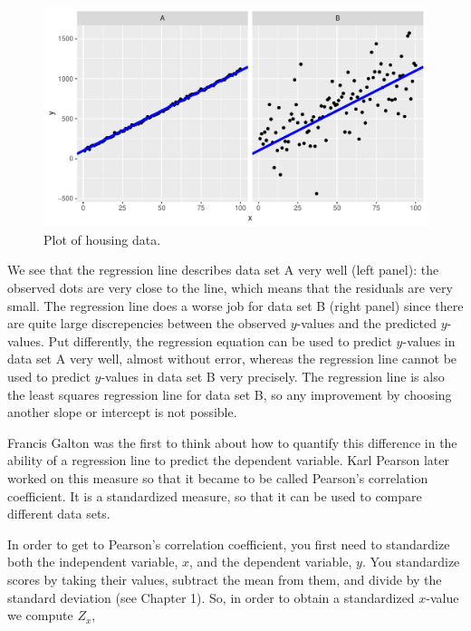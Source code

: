 \documentclass[]{book}\usepackage[]{graphicx}\usepackage[]{color}
\makeatletter
\def\maxwidth{ %
  \ifdim\Gin@nat@width>\linewidth
    \linewidth
  \else
    \Gin@nat@width
  \fi
}
\newenvironment{knitrout}{}{} %
\makeatother
\begin{document}
\begin{knitrout}
\color{fgcolor}\begin{figure}

{\centering \includegraphics[width=\maxwidth]{figure/lm_18-1} 

}

\caption[Plot of housing data]{Plot of housing data.}\label{fig:lm_18}
\end{figure}


\end{knitrout}


We see that the regression line describes data set A very well (left panel): the observed dots are very close to the line, which means that the residuals are very small. The regression line does a worse job for data set B (right panel) since there are quite large discrepencies between the observed $y$-values and the predicted $y$-values. Put differently, the regression equation can be used to predict $y$-values in data set A very well, almost without error, whereas the regression line cannot be used to predict $y$-values in data set B very precisely. The regression line is also the least squares regression line for data set B, so any improvement by choosing another slope or intercept is not possible.

Francis Galton was the first to think about how to quantify this difference in the ability of a regression line to predict the dependent variable. Karl Pearson later worked on this measure so that it became to be called Pearson's correlation coefficient. It is a standardized measure, so that it can be used to compare different data sets.

In order to get to Pearson's correlation coefficient, you first need to standardize both the independent variable, $x$, and the dependent variable, $y$. You standardize scores by taking their values, subtract the mean from them, and divide by the standard deviation (see Chapter 1). So, in order to obtain a standardized $x$-value we compute $Z_x$,
\end{document}
